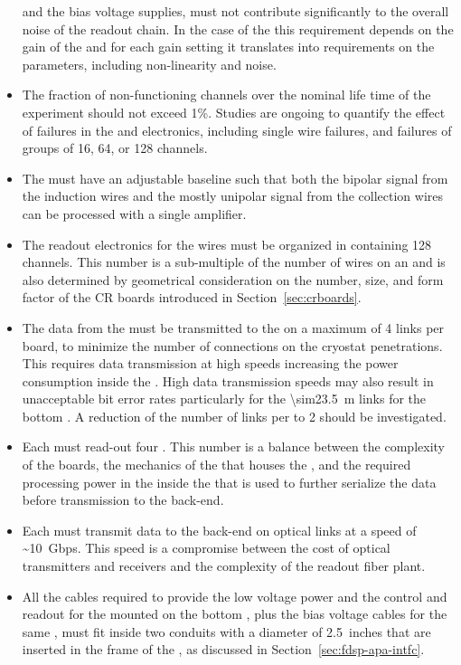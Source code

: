 \begin{itemize}
{and the bias voltage supplies, must not contribute significantly to
the overall noise of the readout chain. In the case of the 
this requirement depends on the gain of the  and
for each gain setting it translates into requirements on
the  parameters, including non-linearity and noise.}
\item{The fraction of non-functioning channels over the \dunelifetime
nominal life time of the  experiment should not
exceed 1\%. Studies are ongoing to quantify the effect of failures
in the  and electronics, including
single wire failures, and failures of groups of
\num{16}, \num{64}, or \num{128} channels.}
\item{The  must have an adjustable baseline such that both the
bipolar signal from the induction wires and the mostly unipolar signal 
from the collection wires can be processed with a single amplifier.}
\item{The readout electronics for the  wires must be organized
in  containing 128 channels. This number is a sub-multiple
of the number of wires on an  and is also determined
by geometrical consideration on the number, size, and form
factor of the CR boards introduced in Section~\ref{sec:crboards}.}
\item{The data from the  must be transmitted to the
 on a maximum of 4 links per board, to minimize
the number of connections on the cryostat penetrations. This 
requires data transmission at high speeds increasing the power
consumption inside the . High data transmission speeds may 
also result in unacceptable bit error rates particularly for the 
\SI{\sim23.5}{m} links for the bottom . A reduction of
the number of links per  to 2 should be investigated.}
\item{Each  must read-out four . This number
is a balance between the complexity of the boards, the mechanics
of the  that houses the , and the 
required processing power in the  inside the
 that is used to further serialize the data 
before transmission to the  back-end.}
\item{Each  must transmit data to the 
back-end on optical links at a speed of \SI{~10}{Gbps}. This speed 
is a compromise between the cost of optical transmitters and
receivers and the complexity of the readout fiber plant.}
\item{All the cables required to provide the low voltage power
and the control and readout for the  mounted on
the bottom , plus the bias voltage cables for
the same , must fit inside two conduits with a
diameter of \SI{2.5}{inches} that are inserted in the frame of
the , as discussed in Section~\ref{sec:fdsp-apa-intfc}.}
\end{itemize}

